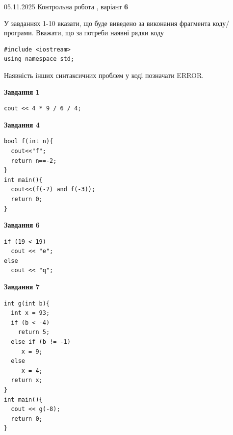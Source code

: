 \documentclass[12pt, ukrainian]{article}
\begin{document}
{\Large{05.11.2025 Контрольна робота , варіант  \No \textbf { 6 }\par}}
{
\begin {large}
У завданнях 1-10 вказати, що буде виведено за виконання фрагмента коду/про\-гра\-ми.
Вважати, що за потреби наявні рядки коду
\begin{verbatim}
#include <iostream>
using namespace std;
\end{verbatim}
Наявність інших синтаксичних проблем у коді позначати ERROR.

\begin{minipage}[t]{7.0cm}

\begin{center}
\textbf{Завдання 1}
\end{center}
\vspace{-8mm}

\begin{verbatim}
cout << 4 * 9 / 6 / 4;
\end{verbatim}



\begin{center}
\textbf{Завдання 4}
\end{center}
\vspace{-8mm}

\begin{verbatim}
bool f(int n){
  cout<<"f";
  return n==-2;
}
int main(){
  cout<<(f(-7) and f(-3));
  return 0;
}
\end{verbatim}



\begin{center}
\textbf{Завдання 6}
\end{center}
\vspace{-8mm}

\begin{verbatim}
if (19 < 19)
  cout << "e";
else
  cout << "q";
\end{verbatim}



\begin{center}
\textbf{Завдання 7}
\end{center}
\vspace{-8mm}

\begin{verbatim}
int g(int b){
  int x = 93;
  if (b < -4)
    return 5;
  else if (b != -1)
     x = 9;
  else
     x = 4;
  return x;
}
int main(){
  cout << g(-8);
  return 0;
}
\end{verbatim}


\end{minipage}
\end{large}}
\end{document}
